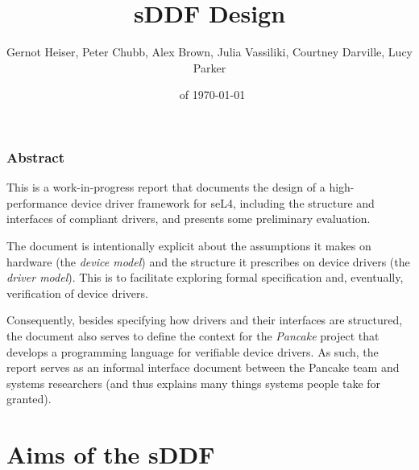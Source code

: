 \documentclass[a4paper,12pt]{report}
\renewcommand{\lstlistoflistings}{\begingroup
    \tocfile{List of Listings}{lol}
\endgroup}
\begin{document}
\newcommand{\lstnumberautorefname}{Line}
\renewcommand{\chapterautorefname}{Chapter}
\renewcommand{\sectionautorefname}{Section}
\renewcommand{\subsectionautorefname}{Section}
\renewcommand{\subsubsectionautorefname}{Section}
\renewcommand{\appendixautorefname}{Appendix}
\renewcommand{\Hfootnoteautorefname}{Footnote}

\setcounter{topnumber}{2}
\renewcommand{\topfraction}{0.91}


\title{sDDF Design}
\author{Gernot Heiser, Peter Chubb, Alex Brown, Julia Vassiliki, Courtney Darville, Lucy Parker}
\date{\Release \ifDraft\ of \today\fi}
\maketitle

\subsection*{Abstract}

This is a work-in-progress report that documents the design of a
high-performance device driver framework for seL4, including the
structure and interfaces of compliant drivers, and presents some
preliminary evaluation.

The document is intentionally explicit about the assumptions it makes on
hardware (the \emph{device model}) and the structure it prescribes on
device drivers (the \emph{driver model}). This is to
facilitate exploring formal specification and, eventually,
verification of device drivers.

Consequently, besides specifying how drivers and their interfaces are
structured, the document also serves to define the context for the
\emph{Pancake} project that develops a programming language for
verifiable device drivers. As such, the report serves as an informal
interface document between the Pancake team and systems researchers
(and thus explains many things systems people take for granted).

\tableofcontents
\listoffigures
\lstlistoflistings
\printnoidxglossaries

\chapter{Aims of the sDDF}\label{s:aims}
\end{document}
